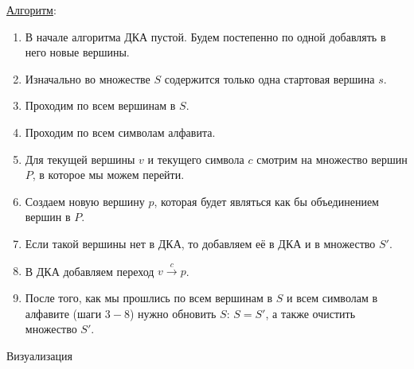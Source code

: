 
\underline{Алгоритм}:
\begin{enumerate}
  \item В начале алгоритма ДКА пустой. Будем постепенно по одной добавлять в
  него новые вершины.
  
  \item Изначально во множестве \(S\) содержится только одна стартовая вершина
  \(s\).

  \item Проходим по всем вершинам в \(S\).
  
  \item Проходим по всем символам алфавита.
  
  \item Для текущей вершины \(v\) и текущего символа \(c\) смотрим на множество
  вершин \(P\), в которое мы можем перейти.

  \item Создаем новую вершину \(p\), которая будет являться как бы объединением
  вершин в \(P\).

  \item Если такой вершины нет в ДКА, то добавляем её в ДКА и в множество
  \(S'\).

  \item В ДКА добавляем переход \(v \xrightarrow{c} p\).
  
  \item После того, как мы прошлись по всем вершинам в \(S\) и всем символам в 
  алфавите (шаги \(3-8\)) нужно обновить \(S\): \(S = S'\), а также очистить
  множество \(S'\).
\end{enumerate}

\todo Визуализация
